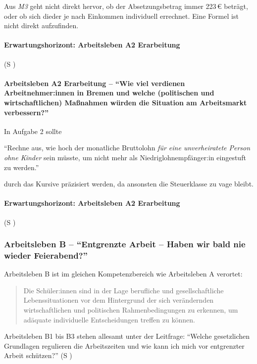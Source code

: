 Aus \emph{M3} geht nicht direkt hervor, ob der Absetzungsbetrag immer 223\,€ beträgt, oder ob sich dieder je nach Einkommen individuell errechnet. Eine Formel ist nicht direkt aufzufinden. 


\paragraph{Erwartungshorizont: Arbeitsleben A2 Erarbeitung} (\gls{S} \pageref{ARBEITSLEBEN-A2})

\paragraph{Arbeitsleben A2 Erarbeitung -- \enquote{Wie viel verdienen Arbeitnehmer:innen in Bremen und welche (politischen und wirtschaftlichen) Maßnahmen würden die Situation am Arbeitsmarkt verbessern?}}
\bigskip

In Aufgabe 2 sollte 

\enquote{Rechne aus, wie hoch der monatliche Bruttolohn \emph{für eine unverheiratete Person ohne Kinder} sein müsste, um nicht mehr als Niedriglohnempfänger:in eingestuft zu werden.} 

durch das Kursive präzisiert werden, da ansonsten die Steuerklasse zu vage bleibt. 






\paragraph{Erwartungshorizont: Arbeitsleben A2 Erarbeitung} (\gls{S} \pageref{ARBEITSLEBEN-A2})



\subsubsection{Arbeitsleben B -- \enquote{Entgrenzte Arbeit – Haben wir bald nie wieder Feierabend?}}
Arbeitsleben B ist im gleichen Kompetenzbereich wie Arbeitsleben A verortet: 
\begin{quotation}
    Die Schüler:innen sind in der Lage berufliche und gesellschaftliche Lebenssituationen vor dem Hintergrund der sich verändernden wirtschaftlichen und politischen Rahmenbedingungen zu erkennen, um adäquate individuelle Entscheidungen treffen zu können.

    \autocite[18]{bplan}
\end{quotation}

Arbeitsleben B1 bis B3 stehen allesamt unter der Leitfrage:
\enquote{Welche gesetzlichen Grundlagen regulieren die Arbeitszeiten und wie kann ich mich vor entgrenzter Arbeit schützen?} (\gls{S} \pageref{ARBEITSLEBEN-B1})



